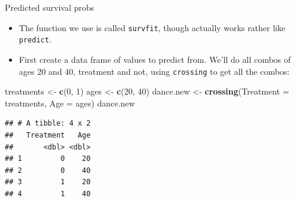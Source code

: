 \documentclass[ignorenonframetext,]{beamer}
\newenvironment{Shaded}{\begin{snugshade}}{\end{snugshade}}
\newcommand{\DataTypeTok}[1]{\textcolor[rgb]{0.13,0.29,0.53}{#1}}
\newcommand{\DecValTok}[1]{\textcolor[rgb]{0.00,0.00,0.81}{#1}}
\newcommand{\KeywordTok}[1]{\textcolor[rgb]{0.13,0.29,0.53}{\textbf{#1}}}
\newcommand{\NormalTok}[1]{#1}
\newcommand{\StringTok}[1]{\textcolor[rgb]{0.31,0.60,0.02}{#1}}
\providecommand{\tightlist}{%
  \setlength{\itemsep}{0pt}\setlength{\parskip}{0pt}}
\begin{document}
\begin{frame}[fragile]{Predicted survival probs}
\protect\hypertarget{predicted-survival-probs-1}{}

\begin{itemize}
\tightlist
\item
  The function we use is called \texttt{survfit}, though actually works
  rather like \texttt{predict}.
\item
  First create a data frame of values to predict from. We'll do all
  combos of ages 20 and 40, treatment and not, using \texttt{crossing}
  to get all the combos:
\end{itemize}

\small

\begin{Shaded}
\begin{Highlighting}[]
\NormalTok{treatments <-}\StringTok{ }\KeywordTok{c}\NormalTok{(}\DecValTok{0}\NormalTok{, }\DecValTok{1}\NormalTok{)}
\NormalTok{ages <-}\StringTok{ }\KeywordTok{c}\NormalTok{(}\DecValTok{20}\NormalTok{, }\DecValTok{40}\NormalTok{)}
\NormalTok{dance.new <-}\StringTok{ }\KeywordTok{crossing}\NormalTok{(}\DataTypeTok{Treatment =}\NormalTok{ treatments, }\DataTypeTok{Age =}\NormalTok{ ages)}
\NormalTok{dance.new}
\end{Highlighting}
\end{Shaded}

\begin{verbatim}
## # A tibble: 4 x 2
##   Treatment   Age
##       <dbl> <dbl>
## 1         0    20
## 2         0    40
## 3         1    20
## 4         1    40
\end{verbatim}

\normalsize

\end{frame}
\end{document}
